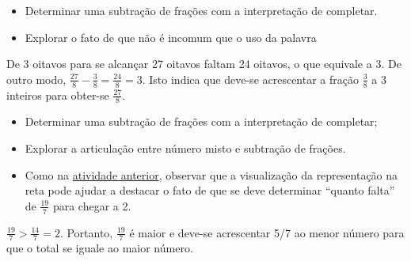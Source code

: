 \begin{multicols}{2}

\begin{objetivos}[label=chap5-ativ10]{}{}

\begin{itemize} %
  \item     Determinar uma subtração de frações com a interpretação de completar.
\end{itemize} %

\end{objetivos}

\begin{orientacoes}

\begin{itemize} %
  \item     Explorar o fato de que não é incomum que o uso da palavra
\end{itemize} %

\end{orientacoes}
\begin{solucao}{}{}
De 3 oitavos para se alcançar 27 oitavos faltam 24 oitavos, o que equivale a 3. De outro modo, $\frac{27}{8} - \frac{3}{8} = \frac{24}{8} = 3$. Isto indica que deve-se acrescentar a fração $\frac{3}{8}$ a 3 inteiros para obter-se $\frac{27}{8}$.
\end{solucao}

\begin{objetivos}[label=chap5-ativ11]{}{}

\begin{itemize} %
    \item       Determinar uma subtração de frações com a interpretação de completar;
    \item       Explorar a articulação entre número misto e subtração de frações.
\end{itemize} %
\end{objetivos}

\begin{orientacoes}{}{}
\begin{itemize} %
    \item       Como na \hyperref[chap5-ativ10]{atividade anterior}, observar que a visualização da representação na reta pode ajudar a destacar o fato de que se deve determinar       ``quanto falta''       de       $\frac{19}{7}$       para chegar a 2.
\end{itemize} %
\end{orientacoes}

\begin{solucao}{}{}
$\frac{19}{7} > \frac{14}{7} = 2$. Portanto, $\frac{19}{7}$ é maior e deve-se acrescentar 5/7 ao menor número para que o total se iguale ao maior número.
\end{solucao}



\end{multicols}
